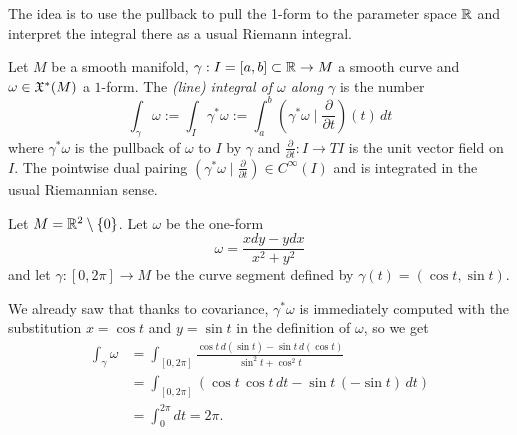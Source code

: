 The idea is to use the pullback to pull the 1-form to the parameter space $\mathbb{R}$ and interpret the integral there as a usual Riemann integral.

\begin{definition}
  Let $M$ be a smooth manifold, $\gamma: I = [a,b]\subset \mathbb{R} \to M$ a smooth curve and $\omega\in\mathfrak{X}^*(M)$ a $1$-form.
  The \emph{(line) integral of $\omega$ along $\gamma$} is the number
  \begin{equation}
    \int_\gamma \omega :=
    \int_I \gamma^*\omega :=
    \int_a^b \left(\gamma^*\omega \mid \frac{\partial}{\partial t}\right)(t)\, dt
  \end{equation}
  where $\gamma^*\omega$ is the pullback of $\omega$ to $I$ by $\gamma$ and $\frac{\partial}{\partial t}: I \to TI$ is the unit vector field on $I$.
  The pointwise dual pairing $\left(\gamma^*\omega \mid \frac{\partial}{\partial t}\right)\in C^\infty(I)$ and is integrated in the usual Riemannian sense.
\end{definition}

\begin{example}\label{ex:li}
  Let $M=\mathbb{R}^2\setminus\{0\}$. Let $\omega$ be the one-form
  \begin{equation}
    \omega = \frac{x dy - y dx}{x^2 + y^2}
  \end{equation}
  and let $\gamma:[0,2\pi]\to M$ be the curve segment defined by $\gamma(t) = (\cos t, \sin t)$.

  We already saw that thanks to covariance, $\gamma^*\omega$ is immediately computed with the substitution $x=\cos t$ and $y=\sin t$ in the definition of $\omega$, so we get
  \begin{align}
    \int_\gamma \omega
     & = \int_{[0,2\pi]} \frac{\cos t\, d(\sin t) - \sin t \, d(\cos t)}{\sin^2 t + \cos^2 t} \\
     & = \int_{[0,2\pi]} (\cos t\, \cos t\, dt - \sin t \, (-\sin t)\, dt)                    \\
     & = \int_0^{2\pi} dt = 2\pi.
  \end{align}
\end{example}

